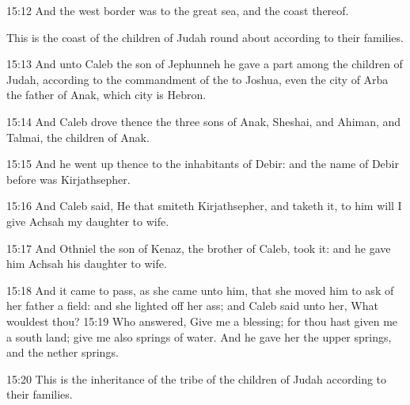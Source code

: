 15:12 And the west border was to the great sea, and the coast thereof.

This is the coast of the children of Judah round about according to their families.

15:13 And unto Caleb the son of Jephunneh he gave a part among the children of Judah, according to the commandment of the \LORD to Joshua, even the city of Arba the father of Anak, which city is Hebron.

15:14 And Caleb drove thence the three sons of Anak, Sheshai, and Ahiman, and Talmai, the children of Anak.

15:15 And he went up thence to the inhabitants of Debir: and the name of Debir before was Kirjathsepher.

15:16 And Caleb said, He that smiteth Kirjathsepher, and taketh it, to him will I give Achsah my daughter to wife.

15:17 And Othniel the son of Kenaz, the brother of Caleb, took it: and he gave him Achsah his daughter to wife.

15:18 And it came to pass, as she came unto him, that she moved him to ask of her father a field: and she lighted off her ass; and Caleb said unto her, What wouldest thou?  15:19 Who answered, Give me a blessing; for thou hast given me a south land; give me also springs of water.  And he gave her the upper springs, and the nether springs.

15:20 This is the inheritance of the tribe of the children of Judah according to their families.

